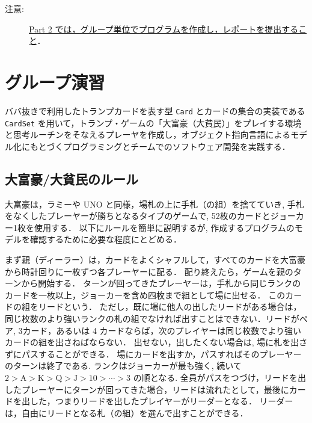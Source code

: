 %
%

\maketitle

\medskip

\begin{description}
\item[注意:] \underline{Part 2 では，グループ単位でプログラムを作成し，レポートを提出すること}．
\end{description}

\medskip

\section{グループ演習}
ババ抜きで利用したトランプカードを表す型 \verb+Card+ とカードの集合の実装である \verb+CardSet+ を用いて，トランプ・ゲームの「大富豪（大貧民）」をプレイする環境と思考ルーチンをそなえるプレーヤを作成し，オブジェクト指向言語によるモデル化にもとづくプログラミングとチームでのソフトウェア開発を実践する．

\subsection*{大富豪/大貧民のルール}
大富豪は，ラミーや UNO と同様，場札の上に手札（の組）を捨てていき, 手札をなくしたプレーヤーが勝ちとなるタイプのゲームで, 52枚のカードとジョーカー1枚を使用する．
以下にルールを簡単に説明するが, 作成するプログラムのモデルを確認するために必要な程度にとどめる．  

まず親（ディーラー）は，カードをよくシャフルして，すべてのカードを大富豪から時計回りに一枚ずつ各プレーヤーに配る．
配り終えたら，ゲームを親のターンから開始する．
ターンが回ってきたプレーヤーは，手札から同じランクのカードを一枚以上，ジョーカーを含め四枚まで組として場に出せる．
このカードの組をリードという．
ただし，既に場に他人の出したリードがある場合は，同じ枚数のより強いランクの札の組でなければ出すことはできない．リードがペア, 3カード，あるいは 4 カードならば，次のプレイヤーは同じ枚数でより強いカードの組を出さねばならない．
出せない，出したくない場合は, 場に札を出さずにパスすることができる．
場にカードを出すか，パスすればそのプレーヤーのターンは終了である. 
ランクはジョーカーが最も強く, 続いて $2 > \mathrm{A} > \mathrm{K} > \mathrm{Q} > \mathrm{J} > 10 > \cdots > 3$ の順となる. 
全員がパスをつづけ，リードを出したプレーヤーにターンが回ってきた場合，リードは流れたとして，最後にカードを出した，つまりリードを出したプレイヤーがリーダーとなる．
リーダーは，自由にリードとなる札（の組）を選んで出すことができる．


